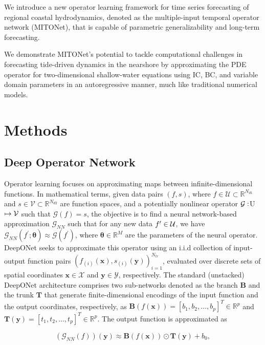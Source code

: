 \documentclass[draft]{agujournal2019}
\begin{document}
We introduce a new operator learning framework for time series forecasting of regional coastal hydrodynamics, denoted as the multiple-input temporal operator network (MITONet), that is capable of parametric generalizability and long-term forecasting.

We demonstrate MITONet's potential to tackle computational challenges in forecasting tide-driven dynamics in the nearshore by approximating the PDE operator for two-dimensional shallow-water equations using IC, BC, and variable domain parameters in an autoregressive manner, much like traditional numerical models. 

\section{Methods}
\subsection{Deep Operator Network}
Operator learning focuses on approximating maps between infinite-dimensional functions. In mathematical terms, given data pairs $(f,s)$, where $f \in \mathcal{U} \subset \mathbb{R}^{N_{d1}}$ and $s \in \mathcal{V} \subset \mathbb{R}^{N_{d2}}$ are function spaces, and a potentially nonlinear operator $\cal G : \cal $U$ \mapsto \cal V$ such that $\mathcal{G}(f) = s$, the objective is to find a neural network-based approximation $\mathcal{G}_{NN}$ such that for any new data $f^\prime \in \cal U$, we have $\mathcal{G}_{NN}( f^\prime; \boldsymbol{\theta}) \approx \mathcal{G}(f^\prime)$, where $\boldsymbol{\theta} \in \mathbb{R}^M$ are the parameters of the neural operator. DeepONet seeks to approximate this operator using an i.i.d collection of input-output function pairs $(f_{(i)}(\mathbf{x}), s_{(i)}(\mathbf{y}))_{i=1}^{N_{tr}}$, evaluated over discrete sets of spatial coordinates $\mathbf{x} \in \mathcal{X}$ and $\mathbf{y} \in \mathcal{Y}$, respectively. The standard (unstacked) DeepONet architecture \cite{lu2021learning} comprises two sub-networks denoted as the branch $\mathbf{B}$ and the trunk $\mathbf{T}$ that generate finite-dimensional encodings of the input function and the output coordinates, respectively, as $\mathbf{B}(f(\mathbf{x})) = [b_1, b_2, \dots, b_p]^T \in \mathbb{R}^p$ and $\mathbf{T}(\mathbf{y}) = [t_1, t_2, \dots, t_p]^T \in \mathbb{R}^p$. The output function is approximated as 

\begin{equation}
(\mathcal{G}_{NN}(f))(\mathbf{y}) \approx \mathbf{B}(f(\mathbf{x})) \odot \mathbf{T}(\mathbf{y}) + b_0,
\end{equation}
\end{document}
